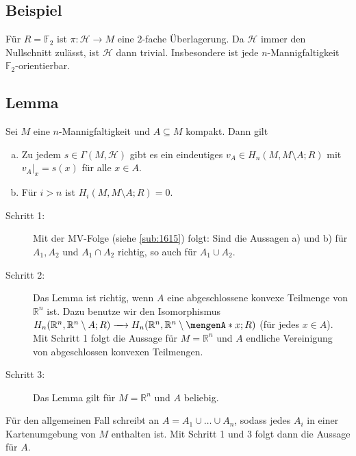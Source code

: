 \subsection{Beispiel} %
\label{sub:1613}
Für $R=\mathds{F}_2$ ist $\pi\colon \mathcal{H} \to M$ eine $2$-fache Überlagerung. Da $\mathcal{H}$ immer den Nullschnitt zulässt, ist $\mathcal{H}$ dann trivial. 
Insbesondere ist jede $n$-Mannigfaltigkeit $\mathds{F}_2$-orientierbar.

\subsection{Lemma} %
\label{sub:1614}
Sei $M$ eine $n$-Mannigfaltigkeit und $A \subseteq M$ kompakt. Dann gilt
\begin{enumerate}[a)]
	\item Zu jedem $s \in \Gamma(M,\mathcal{H})$ gibt es ein eindeutiges $v_A \in H_n(M, M \setminus A;R)$ mit $v_A|_x=s(x)$ für alle $x \in A$.
	\item Für $i>n$ ist $H_i(M,M \setminus A;R)=0$.
\end{enumerate}
\begin{description}
	\item[Schritt 1:] Mit der MV-Folge (siehe \ref{sub:1615}) folgt: Sind die Aussagen a)  und b) für $A_1, A_2$ und $A_1 \cap A_2$ richtig, so auch für $A_1 \cup A_2$.
	\item[Schritt 2:] Das Lemma ist richtig, wenn $A$ eine abgeschlossene konvexe Teilmenge von $\mathds{R}^n$ ist. Dazu benutze wir den Isomorphismus
	\(
		H_n(\mathds{R}^n,\mathds{R}^n \setminus A ;R) \xrightarrow{\quad } H_n(\mathds{R}^n,\mathds{R}^n \setminus \set{x};R)
	\)
	(für jedes $x \in A$). Mit Schritt 1 folgt die Aussage für $M =\mathds{R}^n$ und $A$ endliche Vereinigung von abgeschlossen konvexen Teilmengen.
	\item[Schritt 3:] Das Lemma gilt für $M=\mathds{R}^n$ und $A$ beliebig.
\end{description}
Für den allgemeinen Fall schreibt an $A=A_1 \cup \ldots \cup A_n$, sodass jedes $A_i$ in einer Kartenumgebung von $M$ enthalten ist. Mit Schritt 1 und 3 folgt dann die 
Aussage für $A$. \bewende


